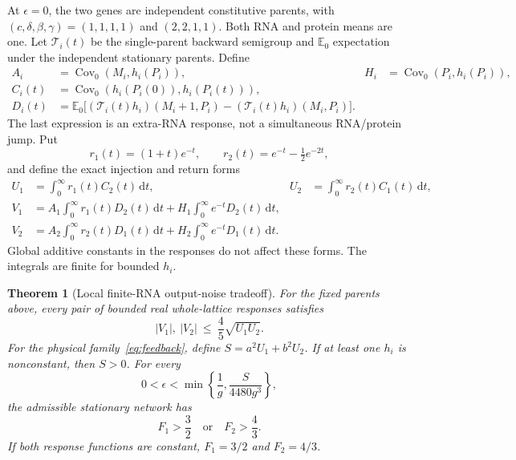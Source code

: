 \documentclass[11pt]{article}
\newcommand{\E}{\mathbb E}
\newcommand{\Cov}{\operatorname{Cov}}
\newcommand{\dd}{\,\mathrm dt}
\newtheorem{theorem}{Theorem}
\begin{document}
At $\epsilon=0$, the two genes are independent constitutive parents,
with $(c,\delta,\beta,\gamma)=(1,1,1,1)$ and $(2,2,1,1)$.
Both RNA and protein means are one. Let $\mathcal T_i(t)$ be the
single-parent backward semigroup and $\E_0$ expectation under the
independent stationary parents. Define
\begin{align}
 A_i&=\Cov_0(M_i,h_i(P_i)),&
 H_i&=\Cov_0(P_i,h_i(P_i)),\nonumber\\
 C_i(t)&=\Cov_0(h_i(P_i(0)),h_i(P_i(t))),\nonumber\\
 D_i(t)&=\E_0\big[(\mathcal T_i(t)h_i)(M_i+1,P_i)
                      -(\mathcal T_i(t)h_i)(M_i,P_i)\big].
 \label{eq:parentforms}
\end{align}
The last expression is an extra-RNA response, not a simultaneous
RNA/protein jump. Put
\begin{equation}
 r_1(t)=(1+t)e^{-t},\qquad
 r_2(t)=e^{-t}-\tfrac12e^{-2t},
\end{equation}
and define the exact injection and return forms
\begin{align}
 U_1&=\int_0^\infty r_1(t)C_2(t)\dd,&
 U_2&=\int_0^\infty r_2(t)C_1(t)\dd,\nonumber\\
 V_1&=A_1\int_0^\infty r_1(t)D_2(t)\dd+
             H_1\int_0^\infty e^{-t}D_2(t)\dd,\nonumber\\
 V_2&=A_2\int_0^\infty r_2(t)D_1(t)\dd+
             H_2\int_0^\infty e^{-t}D_1(t)\dd.
 \label{eq:UV}
\end{align}
Global additive constants in the responses do not affect these forms.
The integrals are finite for bounded $h_i$.

\begin{theorem}[Local finite-RNA output-noise tradeoff]
\label{thm:main}
For the fixed parents above, every pair of bounded real whole-lattice
responses satisfies
\begin{equation}
 |V_1|,\ |V_2|\ \leq\ \frac45\sqrt{U_1U_2}.
 \label{eq:contraction}
\end{equation}
For the physical family~\eqref{eq:feedback}, define
$S=a^2U_1+b^2U_2$. If at least one $h_i$ is nonconstant, then $S>0$.
For every
\begin{equation}
 0<\epsilon<
 \min\left\{\frac1g,\frac{S}{4480g^3}\right\},
 \label{eq:epsilon}
\end{equation}
the admissible stationary network has
\begin{equation}
 F_1>\frac32\quad\text{or}\quad F_2>\frac43.
 \label{eq:tradeoff}
\end{equation}
If both response functions are constant, $F_1=3/2$ and $F_2=4/3$.
\end{theorem}
\end{document}
